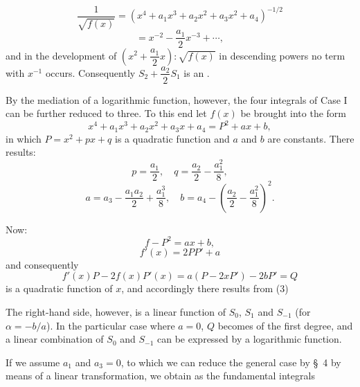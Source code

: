 \[
\frac{1}{\sqrt{f(x)}} = (x^4 + a_1 x^3 + a_2 x^2 + a_3 x^2 + a_4)^{-1/2} %
\]
\[
= x^{-2} - \frac{a_1}{2}x^{-3} + \cdots,
\]
and in the development of $\left(x^2 + \dfrac{a_1}{2}x\right):\sqrt{f(x)}$ in descending powers no term with $x^{-1}$ occurs. Consequently $S_2 + \dfrac{a_2}{2}S_1$ is an . %

By the mediation of a logarithmic function, however, the four integrals of Case I can be further reduced to three. To this end let $f(x)$ be brought into the form
\[
x^4 + a_1 x^3 + a_2 x^2 + a_3 x + a_4 = P^2 + ax + b,
\]
in which $P = x^2 + px + q$ is a quadratic function and $a$ and $b$ are constants. There results:
\[
p = \frac{a_1}{2}, \quad q = \frac{a_2}{2} - \frac{a_1^2}{8},
\]
\[
a = a_3 - \frac{a_1 a_2}{2} + \frac{a_1^3}{8}, \quad b = a_4 - \left(\frac{a_2}{2} - \frac{a_1^2}{8}\right)^2.
\]

Now:
\[
f - P^2 = ax + b,
\]
\[
f'(x) = 2PP' + a
\]
and consequently
\[
f'(x)P - 2f(x)P'(x) = a(P - 2xP') - 2bP' = Q
\]
is a quadratic function of $x$, and accordingly there results from (3)

The right-hand side, however, is a linear function of $S_0$, $S_1$ and $S_{-1}$ (for $\alpha = -b/a$). In the particular case where $a = 0$, $Q$ becomes of the first degree, and a linear combination of $S_0$ and $S_{-1}$ can be expressed by a logarithmic function.

If we assume $a_1$ and $a_3 = 0$, to which we can reduce the general case by \S\ 4 by means of a linear transformation, we obtain as the fundamental integrals
